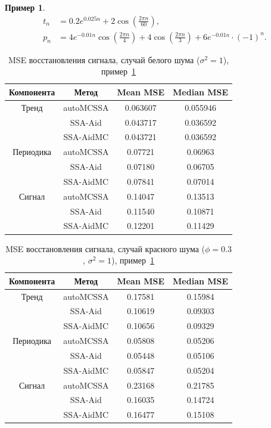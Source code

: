 \documentclass[specialist,
substylefile = spbu_report.rtx,
subf,12pt]{disser}
\theoremstyle{definition}
\newtheorem{example}{Пример}[chapter]
\begin{document}
\begin{example}\label{eg:signal2}
	\begin{align*}
		t_n & =0.2 e^{0.025n} + 2\cos\left(\frac{2\pi n}{60}\right),                                                           \\
		p_n & =4 e^{-0.01n}\cos\left(\frac{2\pi n}{4}\right) + 4\cos\left(\frac{2\pi n}{3}\right) + 6e^{-0.01n}\cdot (-1)^{n}.
	\end{align*}

	\begin{table}[h!]
        \centering
        \caption{MSE восстановления сигнала, случай белого шума ($\sigma^2=1$), пример~\ref{eg:signal2}}
		\label{tab:mse_signal2_wn}
        \begin{tabular}{c|c|c|c}        
			Компонента & Метод & Mean MSE & Median MSE \\
			\hline
			Тренд & autoMCSSA & 0.063607 & 0.055946 \\
			& SSA-Aid & 0.043717 & 0.036592 \\
			& SSA-AidMC & 0.043721  & 0.036592 \\
			\hline
			Периодика & autoMCSSA & 0.07721  & 0.06963 \\
			& SSA-Aid & 0.07180  & 0.06705 \\
			& SSA-AidMC & 0.07841  & 0.07014 \\
			\hline
			Сигнал & autoMCSSA & 0.14047 & 0.13513 \\
			& SSA-Aid & 0.11540   & 0.10871 \\
			& SSA-AidMC & 0.12201  & 0.11429 \\
			\hline
        \end{tabular}
    \end{table}

	\begin{table}[h!]
        \centering
        \caption{MSE восстановления сигнала, случай красного шума ($\phi=0.3$, $\sigma^2=1$), пример~\ref{eg:signal2}}
		\label{tab:mse_signal2_rn}
		\begin{tabular}{c|c|c|c}
			Компонента & Метод & Mean MSE & Median MSE \\
			\hline
			Тренд & autoMCSSA & 0.17581  & 0.15984 \\
			& SSA-Aid & 0.10619  & 0.09303 \\
			& SSA-AidMC & 0.10656  & 0.09329 \\
			\hline
			Периодика & autoMCSSA & 0.05808  & 0.05206 \\
			& SSA-Aid & 0.05448  & 0.05106 \\
			& SSA-AidMC & 0.05847  & 0.05204 \\
			\hline
			Сигнал & autoMCSSA & 0.23168  & 0.21785 \\
			& SSA-Aid & 0.16035  & 0.14724 \\
			& SSA-AidMC & 0.16477  & 0.15108 \\
			\hline
		\end{tabular}
    \end{table}


\end{example}
\end{document}
